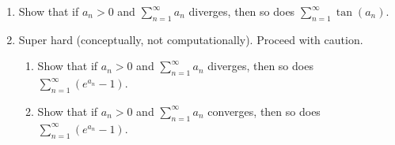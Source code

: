 \documentclass[11pt]{article}
\begin{document}
\begin{enumerate}
  \item Show that if $a_n > 0$ and $\displaystyle \sum_{n=1}^\infty a_n$
  diverges, then so does $\displaystyle \sum_{n=1}^\infty \tan(a_n)$.

  \newpage
  \item Super hard (conceptually, not computationally). Proceed with caution.
  \begin{enumerate}

    \item Show that if $a_n > 0$ and $\displaystyle \sum_{n=1}^\infty a_n$
    diverges, then so does $\displaystyle \sum_{n=1}^\infty \left( e^{a_n} - 1
    \right)$.

    \item Show that if $a_n > 0$ and $\displaystyle \sum_{n=1}^\infty a_n$
    converges, then so does $\displaystyle \sum_{n=1}^\infty \left( e^{a_n} - 1
    \right)$.

  \end{enumerate}

\end{enumerate}
\end{document}
